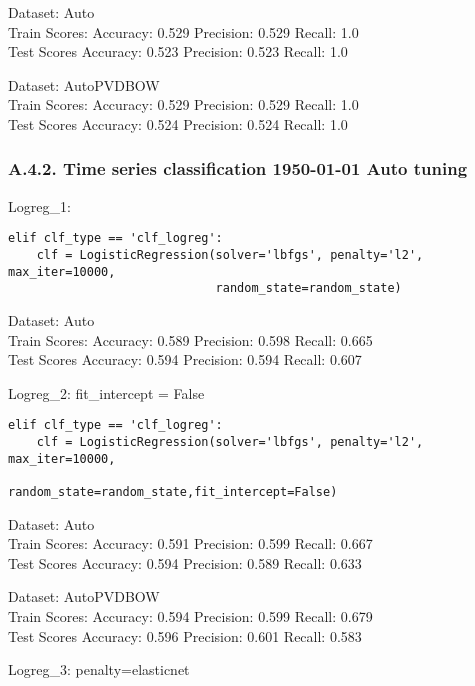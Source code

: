 \documentclass[11pt,preprint, authoryear]{elsarticle}
\numberwithin{equation}{section}
\numberwithin{figure}{section}
\numberwithin{table}{section}
\begin{document}
Dataset: Auto\\
Train Scores: Accuracy: 0.529 Precision: 0.529 Recall: 1.0\\
Test Scores Accuracy: 0.523 Precision: 0.523 Recall: 1.0

Dataset: AutoPVDBOW\\
Train Scores: Accuracy: 0.529 Precision: 0.529 Recall: 1.0\\
Test Scores Accuracy: 0.524 Precision: 0.524 Recall: 1.0

\hypertarget{a.4.2.-time-series-classification-1950-01-01-auto-tuning}{%
\subsubsection*{A.4.2. Time series classification 1950-01-01 Auto
tuning}\label{a.4.2.-time-series-classification-1950-01-01-auto-tuning}}

Logreg\_1:

\begin{verbatim}
elif clf_type == 'clf_logreg':
    clf = LogisticRegression(solver='lbfgs', penalty='l2', max_iter=10000,
                             random_state=random_state)
\end{verbatim}

Dataset: Auto\\
Train Scores: Accuracy: 0.589 Precision: 0.598 Recall: 0.665\\
Test Scores Accuracy: 0.594 Precision: 0.594 Recall: 0.607

Logreg\_2: fit\_intercept = False

\begin{verbatim}
elif clf_type == 'clf_logreg':
    clf = LogisticRegression(solver='lbfgs', penalty='l2', max_iter=10000,
                             random_state=random_state,fit_intercept=False)
\end{verbatim}

Dataset: Auto\\
Train Scores: Accuracy: 0.591 Precision: 0.599 Recall: 0.667\\
Test Scores Accuracy: 0.594 Precision: 0.589 Recall: 0.633

Dataset: AutoPVDBOW\\
Train Scores: Accuracy: 0.594 Precision: 0.599 Recall: 0.679\\
Test Scores Accuracy: 0.596 Precision: 0.601 Recall: 0.583

Logreg\_3: penalty=elasticnet
\end{document}
